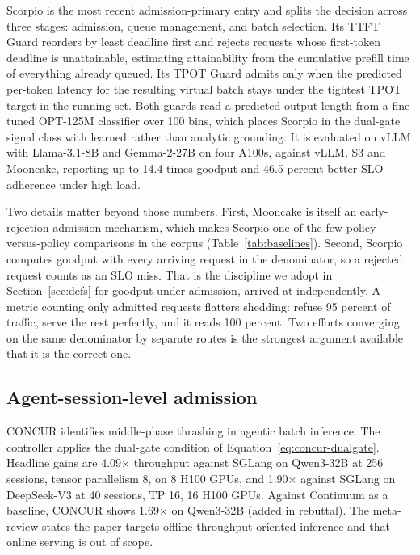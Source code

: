 \documentclass[10pt]{article} %
\theoremstyle{definition}
\begin{document}
Scorpio \citep{tang2026scorpio} is the most recent admission-primary entry
and splits the decision across three stages: admission, queue
management, and batch selection. Its TTFT Guard reorders by least
deadline first and rejects requests whose first-token deadline is
unattainable, estimating attainability from the cumulative prefill time
of everything already queued. Its TPOT Guard admits only when the
predicted per-token latency for the resulting virtual batch stays under
the tightest TPOT target in the running set. Both guards read a
predicted output length from a fine-tuned OPT-125M classifier over 100
bins, which places Scorpio in the dual-gate signal class with learned
rather than analytic grounding. It is evaluated on vLLM with
Llama-3.1-8B and Gemma-2-27B on four A100s, against vLLM, S3 and
Mooncake, reporting up to 14.4 times goodput and 46.5 percent better SLO
adherence under high load.

Two details matter beyond those numbers. First, Mooncake is itself an
early-rejection admission mechanism, which makes Scorpio one of the few
policy-versus-policy comparisons in the corpus
(Table~\ref{tab:baselines}). Second, Scorpio computes goodput with every
arriving request in the denominator, so a rejected request counts as an
SLO miss. That is the discipline we adopt in
Section~\ref{sec:defs} for goodput-under-admission, arrived at
independently. A metric counting only admitted requests flatters
shedding: refuse 95 percent of traffic, serve the rest perfectly, and it
reads 100 percent. Two efforts converging on the same denominator by
separate routes is the strongest argument available that it is the
correct one.

\subsection{Agent-session-level admission}

CONCUR \citep{chen2026concur} identifies middle-phase thrashing in
agentic batch inference. The controller applies the dual-gate
condition of Equation~\ref{eq:concur-dualgate}. Headline gains are
4.09$\times$ throughput against SGLang on Qwen3-32B at 256 sessions,
tensor parallelism 8, on 8 H100 GPUs, and 1.90$\times$ against SGLang
on DeepSeek-V3 at 40 sessions, TP 16, 16 H100 GPUs. Against Continuum
as a baseline, CONCUR shows 1.69$\times$ on Qwen3-32B (added in
rebuttal). The meta-review states the paper targets offline
throughput-oriented inference and that online serving is out of scope.
\end{document}
